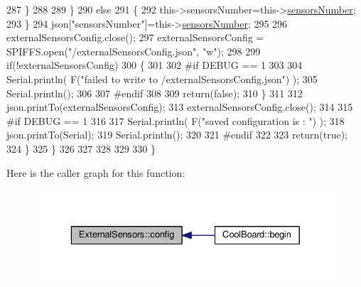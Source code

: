 \begin{DoxyCode}
287                 \}
288  
289             \}
290             \textcolor{keywordflow}{else}
291             \{
292                 this->sensorsNumber=this->\hyperlink{class_external_sensors_a58e4fbf9adeae787d92be5fa33043b5d}{sensorsNumber};
293             \}
294             json[\textcolor{stringliteral}{"sensorsNumber"}]=this->\hyperlink{class_external_sensors_a58e4fbf9adeae787d92be5fa33043b5d}{sensorsNumber};
295 
296             externalSensorsConfig.close();
297             externalSensorsConfig = SPIFFS.open(\textcolor{stringliteral}{"/externalSensorsConfig.json"}, \textcolor{stringliteral}{"w"});
298 
299             \textcolor{keywordflow}{if}(!externalSensorsConfig)
300             \{
301             
302 \textcolor{preprocessor}{            #if DEBUG == 1 }
303 
304                 Serial.println( F(\textcolor{stringliteral}{"failed to write to /externalSensorsConfig.json"}) );
305                 Serial.println();
306             
307 \textcolor{preprocessor}{            #endif}
308 
309                 \textcolor{keywordflow}{return}(\textcolor{keyword}{false});
310             \}
311             
312             json.printTo(externalSensorsConfig);
313             externalSensorsConfig.close();
314             
315 \textcolor{preprocessor}{        #if DEBUG == 1 }
316 
317             Serial.println( F(\textcolor{stringliteral}{"saved configuration is : "}) );
318             json.printTo(Serial);
319             Serial.println();
320         
321 \textcolor{preprocessor}{        #endif}
322 
323             \textcolor{keywordflow}{return}(\textcolor{keyword}{true}); 
324         \}
325     \}   
326     
327 
328 
329 
330 \}
\end{DoxyCode}
Here is the caller graph for this function\+:\nopagebreak
\begin{figure}[H]
\begin{center}
\leavevmode
\includegraphics[width=329pt]{d1/d2f/class_external_sensors_a862a4bd11346b37270d0244c2adabe5a_icgraph}
\end{center}
\end{figure}
\mbox{\label{class_external_sensors_ac829858f587e15a3fcb00567248f0edd}} 
